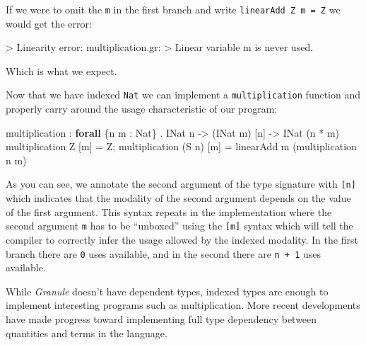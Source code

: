 \documentclass[
]{article}
\newenvironment{Shaded}{}{}
\newcommand{\DataTypeTok}[1]{\textcolor[rgb]{0.56,0.13,0.00}{#1}}
\newcommand{\FunctionTok}[1]{\textcolor[rgb]{0.02,0.16,0.49}{#1}}
\newcommand{\KeywordTok}[1]{\textcolor[rgb]{0.00,0.44,0.13}{\textbf{#1}}}
\newcommand{\NormalTok}[1]{#1}
\newcommand{\OperatorTok}[1]{\textcolor[rgb]{0.40,0.40,0.40}{#1}}
\newcommand{\OtherTok}[1]{\textcolor[rgb]{0.00,0.44,0.13}{#1}}
\begin{document}
If we were to omit the \texttt{m} in the first branch and write
\texttt{linearAdd\ Z\ m\ =\ Z} we would get the error:

\begin{Shaded}
\begin{Highlighting}[]
\OperatorTok{\textgreater{}} \DataTypeTok{Linearity} \FunctionTok{error}\OperatorTok{:}\NormalTok{ multiplication}\OperatorTok{.}\NormalTok{gr}\OperatorTok{:}
\OperatorTok{\textgreater{}} \DataTypeTok{Linear}\NormalTok{ variable }\OtherTok{\textasciigrave{}m\textasciigrave{}}\NormalTok{ is never used}\OperatorTok{.}
\end{Highlighting}
\end{Shaded}

Which is what we expect.

Now that we have indexed \texttt{Nat} we can implement a
\texttt{multiplication} function and properly carry around the usage
characteristic of our program:

\begin{Shaded}
\begin{Highlighting}[]
\NormalTok{multiplication }\OperatorTok{:} \KeywordTok{forall}\NormalTok{ \{n m }\OperatorTok{:} \DataTypeTok{Nat}\NormalTok{\} }\OperatorTok{.} \DataTypeTok{INat}\NormalTok{ n }\OtherTok{{-}\textgreater{}}\NormalTok{ (}\DataTypeTok{INat}\NormalTok{ m) [n] }\OtherTok{{-}\textgreater{}} \DataTypeTok{INat}\NormalTok{ (n }\OperatorTok{*}\NormalTok{ m)}
\NormalTok{multiplication }\DataTypeTok{Z}\NormalTok{ [m] }\OtherTok{=} \DataTypeTok{Z}\NormalTok{;}
\NormalTok{multiplication (}\DataTypeTok{S}\NormalTok{ n) [m] }\OtherTok{=}\NormalTok{ linearAdd m (multiplication n m)}
\end{Highlighting}
\end{Shaded}

As you can see, we annotate the second argument of the type signature
with \texttt{{[}n{]}} which indicates that the modality of the second
argument depends on the value of the first argument. This syntax repeats
in the implementation where the second argument \texttt{m} has to be
``unboxed'' using the \texttt{{[}m{]}} syntax which will tell the
compiler to correctly infer the usage allowed by the indexed modality.
In the first branch there are \texttt{0} uses available, and in the
second there are \texttt{n\ +\ 1} uses available.

While \emph{Granule} doesn't have dependent types, indexed types are
enough to implement interesting programs such as multiplication. More
recent developments have made progress toward implementing full type
dependency between quantities and terms in the
language\cite{dependent_graded}.
\end{document}
